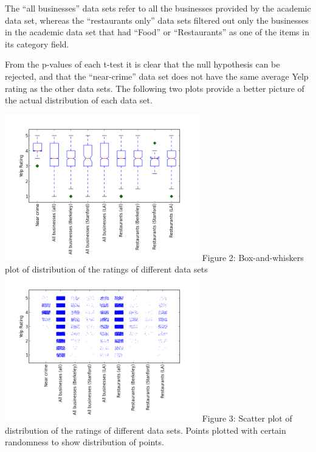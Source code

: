 \documentclass{article}
\begin{document}
The ``all businesses'' data sets refer to all the businesses provided by
the academic data set, whereas the ``restaurants only'' data sets filtered
out only the businesses in the academic data set that had ``Food'' or
``Restaurants'' as one of the items in its category field.

From the p-values of each t-test it is clear that the null hypothesis can
be rejected, and that the ``near-crime'' data set does not have the same
average Yelp rating as the other data sets. The following two plots provide
a better picture of the actual distribution of each data set.

\begin{center}
  \includegraphics[keepaspectratio=true, width=320px]{boxplot.png}
  Figure 2: Box-and-whiskers plot of distribution of the ratings of
  different data sets \\[20pt]

  \includegraphics[keepaspectratio=true, width=320px]{scatter_plot.png}
  Figure 3: Scatter plot of distribution of the ratings of different data
  sets. Points plotted with certain randomness to show distribution of
  points. \\[20pt]
\end{center}
\end{document}
